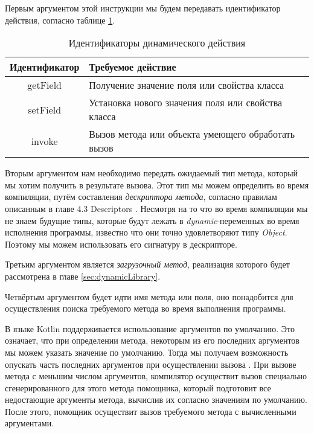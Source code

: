 
Первым аргументом этой инструкции мы будем передавать идентификатор действия, согласно таблице \ref{tab:DynamicCallType}. 

\begin{table}[h]
\caption{\label{tab:DynamicCallType}Идентификаторы динамического действия}
\begin{center}
\begin{tabular}{|c|l|}
\hline
Идентификатор	& Требуемое действие \\
\hline
getField & Получение значение поля или свойства класса  \\
setField & Установка нового значения поля или свойства класса	\\
invoke   & Вызов метода или объекта умеющего обработать вызов  \\
\hline
\end{tabular}
\end{center}
\end{table} 

Вторым аргументом нам необходимо передать ожидаемый тип метода, который мы хотим получить в результате вызова. Этот тип мы можем определить во время компиляции, путём составления \textit{дескриптора метода}, согласно правилам описанным в главе 4.3 Descriptors \cite{book:yellin1996java}. Несмотря на то что во время компиляции мы не знаем будущие типы, которые будут лежать в \textit{dynamic}-переменных во время исполнения программы, известно что они точно удовлетворяют типу \textit{Object}. Поэтому мы можем использовать его сигнатуру в дескрипторе.

Третьим аргументом является \textit{загрузочный метод}, реализация которого будет рассмотрена в главе \ref{sec:dynamicLibrary}.

Четвёртым аргументом будет идти имя метода или поля, оно понадобится для осуществления поиска требуемого метода во время выполнения программы.

В языке Kotlin поддерживается использование аргументов по умолчанию. Это означает, что при определении метода, некоторым из его последних аргументов мы можем указать значение по умолчанию. Тогда мы получаем возможность опускать часть последних аргументов при осуществлении вызова \cite{book:jemerov2017kotlininAction}. При вызове метода с меньшим числом аргументов, компилятор осуществит вызов специально сгенерированного для этого метода помощника, который подготовит все недостающие аргументы метода, вычислив их согласно значениям по умолчанию. После этого, помощник осуществит вызов требуемого метода с вычисленными аргументами.

